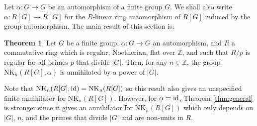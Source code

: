 \documentclass[reqno,11pt,letterpaper]{amsart}
\theoremstyle{plain}
\numberwithin{equation}{subsection}
\newtheorem{theorem}[equation]{Theorem}
\theoremstyle{remark}
\theoremstyle{plain}
\theoremstyle{definition}\newtheorem*{notation}{Notation}
\newtheorem{theorem}{Theorem}
\newcommand{\NK}{\mathrm{NK}}
\newcommand{\BZ}{\mathbb{Z}}
\begin{document}
 Let $\alpha: G \to G$ be an automorphism of a finite group $G$. We shall also write $\alpha: R[G] \to R[G]$ for the $R$-linear ring automorphism of $R[G]$ induced by the group automorphism.  
The main result of this section is:

  \begin{theorem}\label{thm1_appB}
Let $G$ be a finite group,  $\alpha: G\to G$ an automorphism, and $R$ a commutative ring which  is regular, Noetherian, flat over $\BZ$, and such that $R/p$ is regular for all primes $p$ that divide $|G|$. Then, for any $n\in\BZ$, the group $\NK_n(R[G],\alpha)$ is annihilated by a power of $|G|$.
\end{theorem}

Note that 
$\NK_n(R[G],{\rm id})=\NK_n(R[G])$ so this result also gives an unspecified finite annihilator for $\NK_n(R[G])$. However, for $\alpha={\rm id}$, Theorem \ref{thm:general} is stronger since it gives an annihilator for $\NK_n(R[G])$ which only depends on $|G|$, $n$, 
and the primes that divide $|G|$ and are non-units in $R$.
\end{document}
